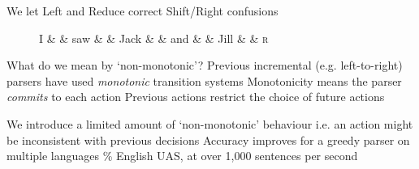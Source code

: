 \documentclass{lecture}
\begin{document}
\begin{plain}{We let Left and Reduce correct Shift/Right confusions}
\begin{figure}
{\begin{dependency}[theme=simple]
\begin{deptext}[column sep=.075cm, row sep=.1ex]
        I \&           \& saw \&          \& Jack       \& \& and     \&           \& Jill \& \& \textsc{r} \\
\end{deptext}
    
    
\end{dependency}
}
\end{figure}
\end{plain}



\begin{points}{What do we mean by `non-monotonic'?}
    \p Previous incremental (e.g. left-to-right) parsers have used
    \emph{monotonic} transition systems
    \p Monotonicity means the parser \emph{commits} to each action
    \p Previous actions restrict the choice of future actions\\
    \vspace*{.2in}
    \par
    \p We introduce a limited amount of `non-monotonic' behaviour
    \p i.e. an action might be inconsistent with previous decisions
    \p Accuracy improves for a greedy parser on multiple languages
    \% English UAS, at over 1,000 sentences per second
\end{points}
\end{document}
